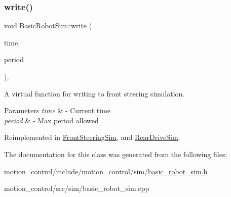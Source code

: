 \mbox{\label{classBasicRobotSim_aa05ea705c931dacabb1e47d9ebab3174}} 
\subsubsection{\texorpdfstring{write()}{write()}}
{\footnotesize\ttfamily void Basic\+Robot\+Sim\+::write (\begin{DoxyParamCaption}\item[{const ros\+::\+Time \&}]{time,  }\item[{const ros\+::\+Duration \&}]{period }\end{DoxyParamCaption})\hspace{0.3cm}{\ttfamily [override]}, {\ttfamily [virtual]}}



A virtual function for writing to front steering simulation. 


\begin{DoxyParams}{Parameters}
{\em time} & -\/ Current time \\
\hline
{\em period} & -\/ Max period allowed \\
\hline
\end{DoxyParams}


Reimplemented in \hyperlink{classFrontSteeringSim_afbf1c3df92319f90d5019729e9067585}{Front\+Steering\+Sim}, and \hyperlink{classRearDriveSim_a814f528a26c9dcf0b0d3490883abb2d2}{Rear\+Drive\+Sim}.



The documentation for this class was generated from the following files\+:\begin{DoxyCompactItemize}
\item 
motion\+\_\+control/include/motion\+\_\+control/sim/\hyperlink{basic__robot__sim_8h}{basic\+\_\+robot\+\_\+sim.\+h}\item 
motion\+\_\+control/src/sim/basic\+\_\+robot\+\_\+sim.\+cpp\end{DoxyCompactItemize}
